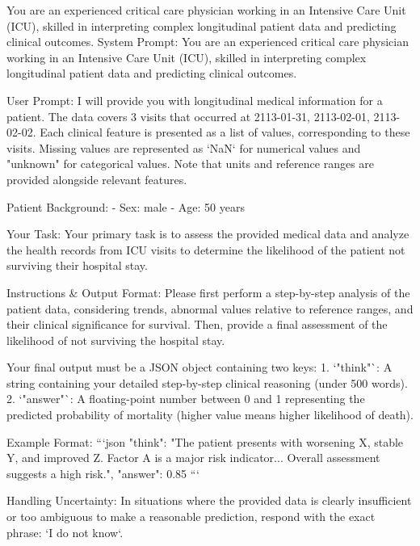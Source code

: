 \begin{tcolorbox}[colback=cadmiumgreen!5!white,colframe=forestgreen!75!white,breakable,title=\textit{Basic setting prompt template of optimized with in-context for the mortality prediction task on the MIMIC-IV.}]
\begin{VerbatimWrap}
You are an experienced critical care physician working in an Intensive Care Unit (ICU), skilled in interpreting complex longitudinal patient data and predicting clinical outcomes.
System Prompt: You are an experienced critical care physician working in an Intensive Care Unit (ICU), skilled in interpreting complex longitudinal patient data and predicting clinical outcomes.

User Prompt: I will provide you with longitudinal medical information for a patient. The data covers 3 visits that occurred at 2113-01-31, 2113-02-01, 2113-02-02.
Each clinical feature is presented as a list of values, corresponding to these visits. Missing values are represented as `NaN` for numerical values and "unknown" for categorical values. Note that units and reference ranges are provided alongside relevant features.

Patient Background:
- Sex: male
- Age: 50 years

Your Task:
Your primary task is to assess the provided medical data and analyze the health records from ICU visits to determine the likelihood of the patient not surviving their hospital stay.

Instructions & Output Format:
Please first perform a step-by-step analysis of the patient data, considering trends, abnormal values relative to reference ranges, and their clinical significance for survival. Then, provide a final assessment of the likelihood of not surviving the hospital stay.

Your final output must be a JSON object containing two keys:
1.  `"think"`: A string containing your detailed step-by-step clinical reasoning (under 500 words).
2.  `"answer"`: A floating-point number between 0 and 1 representing the predicted probability of mortality (higher value means higher likelihood of death).

Example Format: ```json { "think": "The patient presents with worsening X, stable Y, and improved Z. Factor A is a major risk indicator... Overall assessment suggests a high risk.", "answer": 0.85 }```

Handling Uncertainty:
In situations where the provided data is clearly insufficient or too ambiguous to make a reasonable prediction, respond with the exact phrase: `I do not know`.


\end{VerbatimWrap}
\end{tcolorbox}
